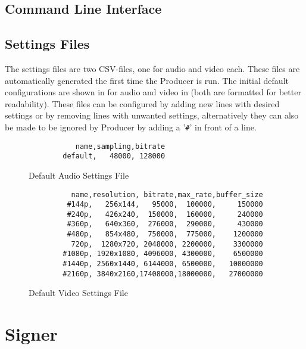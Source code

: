 \subsection{Command Line Interface\label{sec:cli_producer}}


\subsection{Settings Files\label{sec:settings}}

The settings files are two CSV-files, one for audio and video each. These files are automatically generated the first time the Producer is run. The initial default configurations are shown in  for audio and video in  (both are formatted for better readability). These files can be configured by adding new lines with desired settings or by removing lines with unwanted settings, alternatively they can also be made to be ignored by Producer by adding a '\texttt{\#}' in front of a line.

\begin{figure}
    \centering
    \begin{lstlisting}
           name,sampling,bitrate
        default,   48000, 128000
    \end{lstlisting}
    \caption{Default Audio Settings File}
    \label{list:audio}
\end{figure}

\begin{figure}
    \centering
    \begin{lstlisting}
          name,resolution, bitrate,max_rate,buffer_size
         #144p,   256x144,   95000,  100000,     150000
         #240p,   426x240,  150000,  160000,     240000
         #360p,   640x360,  276000,  290000,     430000
         #480p,   854x480,  750000,  775000,    1200000
          720p,  1280x720, 2048000, 2200000,    3300000
        #1080p, 1920x1080, 4096000, 4300000,    6500000
        #1440p, 2560x1440, 6144000, 6500000,   10000000
        #2160p, 3840x2160,17408000,18000000,   27000000
    \end{lstlisting}
    \caption{Default Video Settings File}
    \label{list:video}
\end{figure}

\section{Signer\label{sec:signer}}

